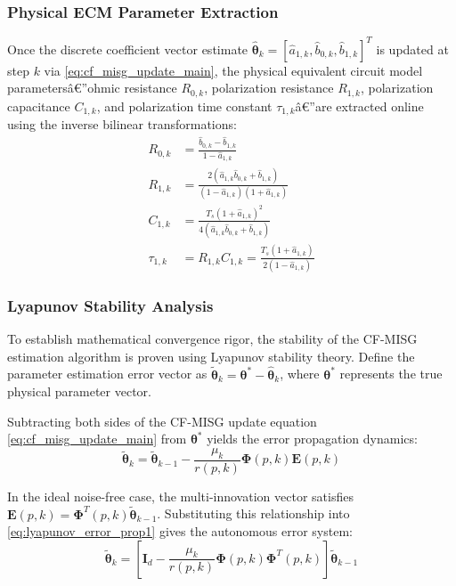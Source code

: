 \subsubsection{Physical ECM Parameter Extraction}
Once the discrete coefficient vector estimate $\hat{\boldsymbol{\theta}}_k = [\hat{a}_{1,k}, \hat{b}_{0,k}, \hat{b}_{1,k}]^T$ is updated at step $k$ via \eqref{eq:cf_misg_update_main}, the physical equivalent circuit model parametersâ€”ohmic resistance $R_{0,k}$, polarization resistance $R_{1,k}$, polarization capacitance $C_{1,k}$, and polarization time constant $\tau_{1,k}$â€”are extracted online using the inverse bilinear transformations:
\begin{align}
R_{0,k} &= \frac{\hat{b}_{0,k} - \hat{b}_{1,k}}{1 - \hat{a}_{1,k}} \label{eq:cf_extract_r0} \\
R_{1,k} &= \frac{2(\hat{a}_{1,k} \hat{b}_{0,k} + \hat{b}_{1,k})}{(1 - \hat{a}_{1,k})(1 + \hat{a}_{1,k})} \label{eq:cf_extract_r1} \\
C_{1,k} &= \frac{T_s (1 + \hat{a}_{1,k})^2}{4(\hat{a}_{1,k} \hat{b}_{0,k} + \hat{b}_{1,k})} \label{eq:cf_extract_c1} \\
\tau_{1,k} &= R_{1,k} C_{1,k} = \frac{T_s (1 + \hat{a}_{1,k})}{2(1 - \hat{a}_{1,k})} \label{eq:cf_extract_tau1}
\end{align}

\subsubsection{Lyapunov Stability Analysis}
To establish mathematical convergence rigor, the stability of the CF-MISG estimation algorithm is proven using Lyapunov stability theory. Define the parameter estimation error vector as $\tilde{\boldsymbol{\theta}}_k = \boldsymbol{\theta}^* - \hat{\boldsymbol{\theta}}_k$, where $\boldsymbol{\theta}^*$ represents the true physical parameter vector.

Subtracting both sides of the CF-MISG update equation \eqref{eq:cf_misg_update_main} from $\boldsymbol{\theta}^*$ yields the error propagation dynamics:
\begin{equation}
\tilde{\boldsymbol{\theta}}_k = \tilde{\boldsymbol{\theta}}_{k-1} - \frac{\mu_k}{r(p, k)} \boldsymbol{\Phi}(p, k) \mathbf{E}(p, k)
\label{eq:lyapunov_error_prop1}
\end{equation}

In the ideal noise-free case, the multi-innovation vector satisfies $\mathbf{E}(p, k) = \boldsymbol{\Phi}^T(p, k) \tilde{\boldsymbol{\theta}}_{k-1}$. Substituting this relationship into \eqref{eq:lyapunov_error_prop1} gives the autonomous error system:
\begin{equation}
\tilde{\boldsymbol{\theta}}_k = \left[ \mathbf{I}_d - \frac{\mu_k}{r(p, k)} \boldsymbol{\Phi}(p, k) \boldsymbol{\Phi}^T(p, k) \right] \tilde{\boldsymbol{\theta}}_{k-1}
\label{eq:lyapunov_error_autonomous}
\end{equation}

